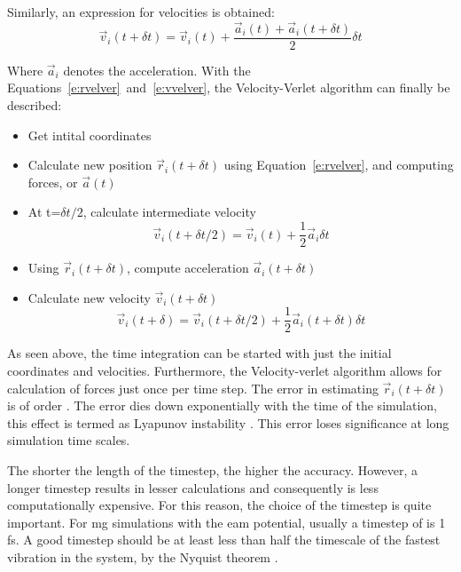 Similarly, an expression for velocities is obtained:
\begin{equation} \label{e:vvelver}
\vec{v}_i(t+\delta t) = \vec{v}_i(t) + \frac{\vec{a}_i(t) + \vec{a}_i(t+\delta t)}{2}\delta t
\end{equation}

Where $\vec{a}_i$ denotes the acceleration. With the Equations~\ref{e:rvelver}~and~\ref{e:vvelver}, the Velocity-Verlet algorithm can finally be described:

\begin{itemize}[noitemsep]
\item Get intital coordinates
\item Calculate new position $\vec{r}_i(t+\delta t)$ using Equation~\ref{e:rvelver}, and computing forces, or $\vec{a}(t)$
\item At t=$\delta t/2$, calculate intermediate velocity \begin{equation} \vec{v}_i(t+\delta t/2) = \vec{v}_i(t) + \frac{1}{2}\vec{a}_i \delta t \end{equation}
\item Using $\vec{r}_i(t+\delta t)$, compute acceleration $\vec{a}_i(t+\delta t)$
\item Calculate new velocity $\vec{v}_i(t+\delta t)$ \begin{equation} \vec{v}_i(t+\delta) = \vec{v}_i(t+\delta t/2) + \frac{1}{2}\vec{a}_i(t+\delta t) \delta t \end{equation}
\end{itemize}

As seen above, the time integration can be started with just the initial coordinates and velocities. Furthermore, the Velocity-verlet algorithm allows for calculation of forces just once per time step. The error in estimating $\vec{r}_i(t+\delta t)$ is of order . The error dies down exponentially with the time of the simulation, this effect is termed as Lyapunov instability \cite{Frenkel1997}. This error loses significance at long simulation time scales. \par

The shorter the length of the timestep, the higher the accuracy. However, a longer timestep results in lesser calculations and consequently is less computationally expensive. For this reason, the choice of the timestep is quite important. For \gls{mg} simulations with the \gls{eam} potential, usually a timestep of is 1 \gls{fs}. A good timestep should be at least less than half the timescale of the fastest vibration in the system, by the Nyquist theorem \cite{Shannon1949}.


